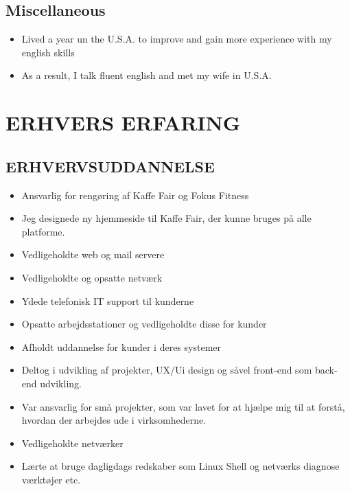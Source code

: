 \documentclass[11pt,a4paper,sans]{moderncv}        %
\begin{document}
\subsection{Miscellaneous}
\begin{itemize}
\item Lived a year un the U.S.A. to improve and gain more experience with my english skills
\item As a result, I talk fluent english and met my wife in U.S.A.
\end{itemize}
\bigskip
\else
\section{ERHVERS ERFARING}
\subsection{ERHVERVSUDDANNELSE}
\begin{itemize}
\item Ansvarlig for rengøring af Kaffe Fair og Fokus Fitness
\end{itemize}
\bigskip
{}
\begin{itemize}
\item Jeg designede ny hjemmeside til Kaffe Fair, der kunne bruges på alle platforme.
\end{itemize}
\bigskip
{}
\begin{itemize}
\item Vedligeholdte web og mail servere
\item Vedligeholdte og opsatte netværk
\item Ydede telefonisk IT support til kunderne
\item Opsatte arbejdsstationer og vedligeholdte disse for kunder
\item Afholdt uddannelse for kunder i deres systemer
\item Deltog i udvikling af projekter, UX/Ui design og såvel front-end som back-end udvikling.
\end{itemize}
\bigskip
{}
\begin{itemize}
\item Var ansvarlig for små projekter, som var lavet for at hjælpe mig til at forstå, hvordan der arbejdes ude i virksomhederne.
\item Vedligeholdte netværker
\item Lærte at bruge dagligdags redskaber som Linux Shell og netværks diagnose værktøjer etc.
\end{itemize}
\bigskip
\end{document}

